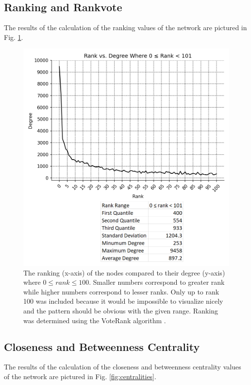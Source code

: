 \documentclass[9pt,twocolumn,twoside]{pnas-new}
\begin{document}
\subsection{Ranking and Rankvote} The results of the calculation of the ranking values of the network are pictured in Fig. \ref{fig:vote_ranks}.

\begin{figure}
\centering
\includegraphics[width=.8\linewidth]{vote_ranks}
\caption{The ranking (x-axis) of the nodes compared to their degree (y-axis) where $0 \le rank \le 100$. Smaller numbers correspond to greater rank while higher numbers correspond to lesser ranks. Only up to rank 100 was included because it would be impossible to visualize nicely and the pattern should be obvious with the given range. Ranking was determined using the VoteRank algorithm \cite{networkxvoteranks}.
}
\label{fig:vote_ranks}
\end{figure}

\subsection{Closeness and Betweenness Centrality} The results of the calculation of the closeness and betweenness centrality values of the network are pictured in Fig. \ref{fig:centralities}.
\end{document}
